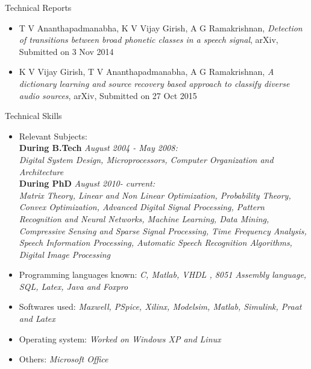 \documentclass[10pt]{article}
\begin{document}
\begin{cv}
\begin{cvlist}{Technical Reports}
\item
\begin{itemize}
\item T V Ananthapadmanabha, K V Vijay Girish, A G Ramakrishnan, \textit{Detection of transitions between broad phonetic classes in a speech signal}, arXiv, Submitted on 3 Nov 2014
\item K V Vijay Girish, T V Ananthapadmanabha, A G Ramakrishnan, \textit{A dictionary learning and source recovery based approach to classify diverse audio sources}, arXiv, Submitted on 27 Oct 2015
\end{itemize}
\end{cvlist}

\begin{cvlist}{Technical Skills}
\item
\begin{itemize}\itemsep=0.25em
	\item Relevant Subjects:\\
	\textbf{During B.Tech}  \textit{August 2004 - May 2008:}\\
 \textit{Digital System Design,  Microprocessors,
Computer Organization and Architecture}\\
\textbf{During PhD} \textit{August 2010- current:}\\
\textit{Matrix Theory,
Linear and Non Linear Optimization, Probability Theory,  Convex Optimization,
Advanced Digital Signal Processing,
Pattern Recognition and Neural Networks, Machine Learning, Data Mining, Compressive Sensing and Sparse Signal Processing, Time Frequency Analysis, Speech Information Processing, Automatic Speech Recognition Algorithms, Digital Image Processing}



	\item Programming languages known:
 \textit{C, Matlab, VHDL , 8051 Assembly language, SQL, Latex, Java
and Foxpro}

\item Softwares used: \textit{Maxwell, PSpice, Xilinx, Modelsim, Matlab, Simulink, Praat and Latex}
\item Operating system: \textit{Worked on Windows XP and Linux}
\item Others: \textit{Microsoft Office}



	\end{itemize}

\end{cvlist}



\end{cv}
\end{document}
